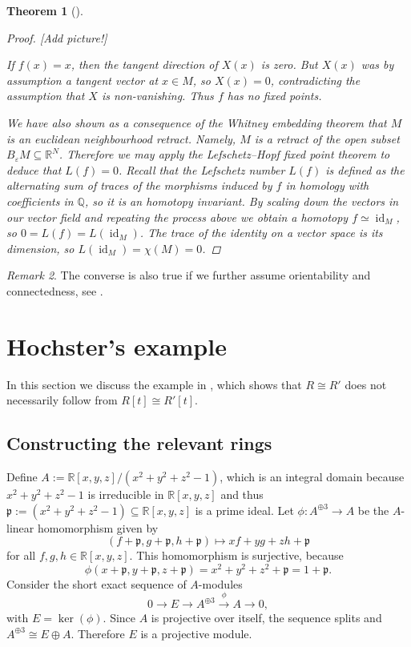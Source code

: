 \documentclass[A4paper, 12pt, british, reqno]{amsart}
\newcommand{\Q}{\mathbb{Q}} %
\newcommand{\R}{\mathbb{R}} %
\newcommand{\p}{\mathfrak{p}}
\theoremstyle{plain}
\newtheorem{thm}{Theorem}[section]
\theoremstyle{definition}
\theoremstyle{remark}
\newtheorem{rem}[thm]{Remark}
\theoremstyle{plain}
\theoremstyle{definition}
\theoremstyle{remark}
\theoremstyle{plain}
\theoremstyle{definition}
\theoremstyle{remark}
\DeclareMathOperator{\id}{id}
\newcommand{\op}{\oplus}
\begin{document}
{\begin{thm}[{\cite[Corollary IV.23.6]{bre93}}]
\begin{proof}
	{\color{red}[Add picture!]}

	If $f(x)=x$, then the tangent direction of $X(x)$ is zero.
	But $X(x)$ was by assumption a tangent vector at $x\in M$, so $X(x)=0$, contradicting the assumption that $X$ is non-vanishing.
	Thus $f$ has no fixed points.

	We have also shown as a consequence of the Whitney embedding theorem that $M$ is an euclidean neighbourhood retract.
	Namely, $M$ is a retract of the open subset $B_{\varepsilon}M\subseteq \R^{N}$.
	Therefore we may apply the Lefschetz--Hopf fixed point theorem \cite[Corollary IV.23.5]{bre93} to deduce that $L(f)=0$.
	Recall that the Lefschetz number $L(f)$ is defined as the alternating sum of traces of the morphisms induced by $f$ in homology with coefficients in $\Q$, so it is an homotopy invariant.
	By scaling down the vectors in our vector field and repeating the process above we obtain a homotopy $f\simeq \id_{M}$, so $0=L(f)=L(\id_{M})$.
	The trace of the identity on a vector space is its dimension, so $L(\id_{M})=\chi(M)=0$.
    \end{proof}
\end{thm}

\begin{rem}
    The converse is also true if we further assume orientability and connectedness, see \cite[Corollary VII.14.5]{bre93}.
\end{rem}
}

\section{Hochster's example}

In this section we discuss the example in \cite{hoc72}, which shows that $R\cong R'$ does not necessarily follow from $R[t]\cong R'[t]$.

\subsection{Constructing the relevant rings}
Define $A:=\R[x,y,z]/(x^{2}+y^{2}+z^{2}-1)$, which is an integral domain because $x^{2}+y^{2}+z^{2}-1$ is irreducible in $\R[x,y,z]$ and thus $\p:=(x^{2}+y^{2}+z^{2}-1) \subseteq \R[x,y,z]$ is a prime ideal.
Let $\phi\colon A^{\op 3}\to A$ be the $A$-linear homomorphism given by
\[ (f+\p,g+\p,h+\p)\longmapsto xf+yg+zh+\p \]
for all $f,g,h\in\R[x,y,z]$.
This homomorphism is surjective, because
\[ \phi(x+\p,y+\p,z+\p)=x^{2}+y^{2}+z^{2}+\p=1+\p. \]
Consider the short exact sequence of $A$-modules
\[ 0\to E\to A^{\op 3}\xrightarrow{\phi} A\to 0, \]
with $E=\ker(\phi)$.
Since $A$ is projective over itself, the sequence splits and $A^{\op 3}\cong E\op A$.
Therefore $E$ is a projective module.
\end{document}
